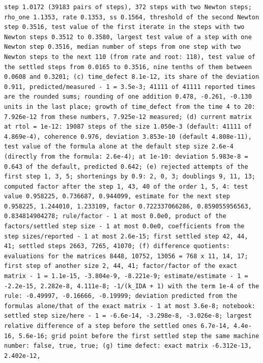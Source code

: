 \documentclass[
  10pt,
]{article}
\begin{document}
\begin{verbatim}
step 1.0172 (39183 pairs of steps), 372 steps with two Newton steps; rho_one 1.1353, rate 0.1353, ss 0.1564, threshold of the second Newton step 0.3516, test value of the first iterate in the steps with two Newton steps 0.3512 to 0.3580, largest test value of a step with one Newton step 0.3516, median number of steps from one step with two Newton steps to the next 110 (from rate and root: 118), test value of the settled steps from 0.0165 to 0.3516, nine tenths of them between 0.0608 and 0.3201; (c) time_defect 8.1e-12, its share of the deviation 0.911, predicted/measured - 1 = 3.5e-3; 41111 of 41111 reported times are the rounded sums; rounding of one addition 0.478, -0.261, -0.130 units in the last place; growth of time_defect from the time 4 to 20: 7.926e-12 from these numbers, 7.925e-12 measured; (d) current matrix at rtol = 1e-12: 19087 steps of the size 1.050e-3 (default: 41111 of 4.869e-4), coherence 0.976, deviation 3.853e-10 (default 4.808e-11), test value of the formula alone at the default step size 2.6e-4 (directly from the formula: 2.6e-4); at 1e-10: deviation 5.983e-8 = 0.643 of the default, predicted 0.642; (e) rejected attempts of the first step 1, 3, 5; shortenings by 0.9: 2, 0, 3; doublings 9, 11, 13; computed factor after the step 1, 43, 40 of the order 1, 5, 4: test value 0.958225, 0.736687, 0.944099, estimate for the next step 0.958225, 1.244010, 1.233109, factor 0.722337066286, 0.859055956563, 0.834814904278; rule/factor - 1 at most 0.0e0, product of the factors/settled step size - 1 at most 0.0e0, coefficients from the step sizes/reported - 1 at most 2.6e-15; first settled step 42, 44, 41; settled steps 2663, 7265, 41070; (f) difference quotients: evaluations for the matrices 8448, 10752, 13056 = 768 x 11, 14, 17; first step of another size 2, 44, 41; factor/factor of the exact matrix - 1 = 1.1e-15, -3.804e-9, -8.221e-9; estimate/estimate - 1 = -2.2e-15, 2.282e-8, 4.111e-8; -1/(k_IDA + 1) with the term 1e-4 of the rule: -0.49997, -0.16666, -0.19999; deviation predicted from the formulas alone/that of the exact matrix - 1 at most 3.6e-8; notebook: settled step size/here - 1 = -6.6e-14, -3.298e-8, -3.026e-8; largest relative difference of a step before the settled ones 6.7e-14, 4.4e-16, 5.6e-16; grid point before the first settled step the same machine number: false, true, true; (g) time defect: exact matrix -6.312e-13, 2.402e-12,

\end{verbatim}
\end{document}
